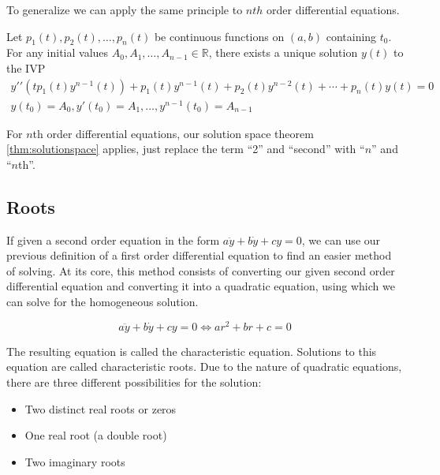     To generalize we can apply the same principle to $nth$ order differential equations.

        \begin{thm}\label{thm:neau}
        Let $p_1(t), p_2(t), \dots, p_n(t)$ be continuous functions on $(a, b)$ containing $t_0$. For any initial values $A_0, A_1, \dots, A_{n-1} \in \mathbb{R}$, there exists a unique solution $y(t)$ to the IVP
        \[
        \begin{aligned}
            y\prime\prime(tp_1(t)y^{n - 1}(t)) + p_1(t)y^{n - 1}(t) + p_2(t)y^{n - 2}(t) + \cdots + p_n(t)y(t) = 0\\
            y(t_0) = A_0, y\prime(t_0) = A_1, \dots, y^{n - 1}(t_0) = A_{n-1}
        \end{aligned}
        \]
    \end{thm}

    For $n$th order differential equations, our solution space theorem \eqref{thm:solutionspace} applies, just replace the term ``2'' and ``second'' with ``$n$'' and ``$n$th''.

    \subsection{Roots}\label{sec:2deroots}
    If given a second order equation in the form $a \ddot{y} + b \dot{y} + cy = 0$, we can use our previous definition of a first order differential equation to find an easier method of solving. At its core, this method consists of converting our given second order differential equation and converting it into a quadratic equation, using which we can solve for the homogeneous solution.

        \begin{equation}\label{eq:2de-quad}
            a \ddot{y} + b \dot{y} + cy = 0 \Leftrightarrow ar^2 + br + c = 0
        \end{equation}

    The resulting equation is called the characteristic equation. Solutions to this equation are called characteristic roots. Due to the nature of quadratic equations, there are three different possibilities for the solution:

        \begin{itemize}
            \item Two distinct real roots or zeros
            \item One real root (a double root)
            \item Two imaginary roots
        \end{itemize}


